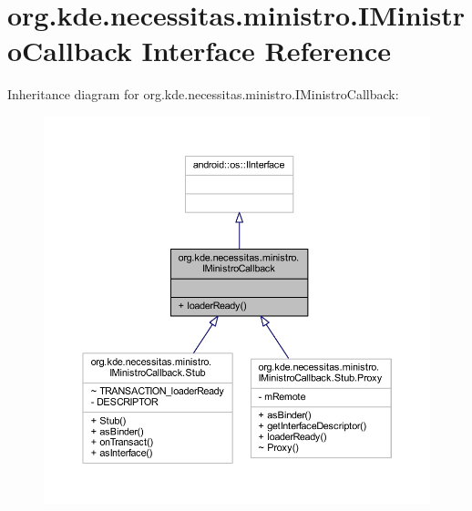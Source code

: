 \hypertarget{interfaceorg_1_1kde_1_1necessitas_1_1ministro_1_1_i_ministro_callback}{\section{org.\-kde.\-necessitas.\-ministro.\-I\-Ministro\-Callback Interface Reference}
\label{d1/dc0/interfaceorg_1_1kde_1_1necessitas_1_1ministro_1_1_i_ministro_callback}
}


Inheritance diagram for org.\-kde.\-necessitas.\-ministro.\-I\-Ministro\-Callback\-:\nopagebreak
\begin{figure}[H]
\begin{center}
\leavevmode
\includegraphics[width=350pt]{d4/da9/interfaceorg_1_1kde_1_1necessitas_1_1ministro_1_1_i_ministro_callback__inherit__graph}
\end{center}
\end{figure}


